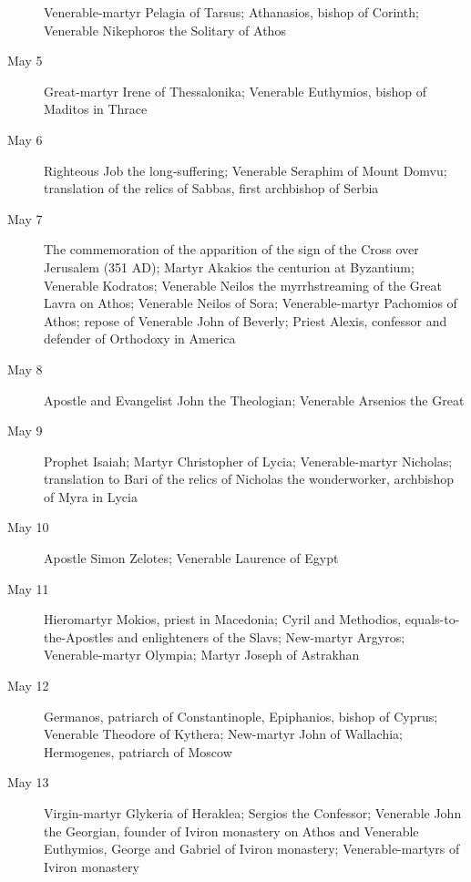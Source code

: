 \begin{description}
Venerable-martyr Pelagia of Tarsus; Athanasios, bishop of Corinth; Venerable Nikephoros the Solitary of Athos

\item[May 5]

Great-martyr Irene of Thessalonika; Venerable Euthymios, bishop of Maditos in Thrace

\item[May 6]

Righteous Job the long-suffering; Venerable Seraphim of Mount Domvu; translation of the relics of Sabbas, first archbishop of Serbia

\item[May 7]

The commemoration of the apparition of the sign of the Cross over Jerusalem (351 AD); Martyr Akakios the centurion at Byzantium; Venerable Kodratos; Venerable Neilos the myrrhstreaming of the Great Lavra on Athos; Venerable Neilos of Sora; Venerable-martyr Pachomios of Athos; repose of Venerable John of Beverly; Priest Alexis, confessor and defender of Orthodoxy in America

\item[May 8]

Apostle and Evangelist John the Theologian; Venerable Arsenios the Great

\item[May 9]

Prophet Isaiah; Martyr Christopher of Lycia; Venerable-martyr Nicholas; translation to Bari of the relics of Nicholas the wonderworker, archbishop of Myra in Lycia

\item[May 10]

Apostle Simon Zelotes; Venerable Laurence of Egypt
\item[May 11]

Hieromartyr Mokios, priest in Macedonia; Cyril and Methodios, equals-to-the-Apostles and enlighteners of the Slavs; New-martyr Argyros; Venerable-martyr Olympia; Martyr Joseph of Astrakhan

\item[May 12]

Germanos, patriarch of Constantinople, Epiphanios, bishop of Cyprus; Venerable Theodore of Kythera; New-martyr John of Wallachia; Hermogenes, patriarch of Moscow

\item[May 13]

Virgin-martyr Glykeria of Heraklea; Sergios the Confessor; Venerable John the Georgian, founder of Iviron monastery on Athos and Venerable Euthymios, George and Gabriel of Iviron monastery; Venerable-martyrs of Iviron monastery


\end{description}
